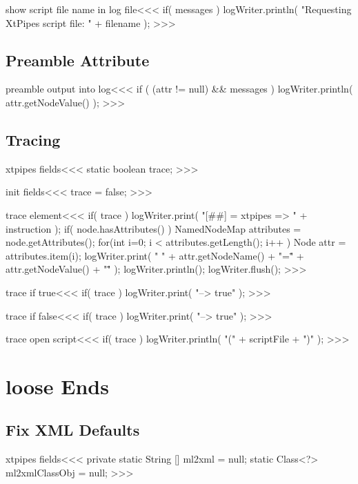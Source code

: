 \documentclass{article}
\begin{document}
\<show script file name in log file\><<<
if( messages ){
   logWriter.println(
      "Requesting XtPipes script file: "
      + filename );
}
>>>


\subsection{Preamble Attribute}

\<preamble output into log\><<<
if ( (attr != null) && messages ) {
   logWriter.println( attr.getNodeValue() );
}
>>>



\subsection{Tracing}


\<xtpipes fields\><<<
static boolean trace;
>>>

\<init fields\><<<
trace = false;
>>>



\<trace element\><<<
if( trace ){
   logWriter.print( "[##] = xtpipes => " + instruction );
   if( node.hasAttributes() ){
      NamedNodeMap attributes = node.getAttributes();
      for(int i=0; i < attributes.getLength(); i++ ){
         Node attr = attributes.item(i);
         logWriter.print( " "   + attr.getNodeName() 
                         + "=\"" + attr.getNodeValue() + "\"" );
   } } 
   logWriter.println(); logWriter.flush();
}
>>>

\<trace if true\><<<
if( trace ){
   logWriter.print( "--> true" );
}
>>>

\<trace if false\><<<
if( trace ){
   logWriter.print( "--> true" );
}
>>>


\<trace open script\><<<
if( trace ){
   logWriter.println( "(" + scriptFile + ")" );
}
>>>



\section{loose Ends}

\subsection{Fix XML Defaults}

\<xtpipes fields\><<<
private static String [] ml2xml = null;
static Class<?> ml2xmlClassObj = null;
>>>
\end{document}
